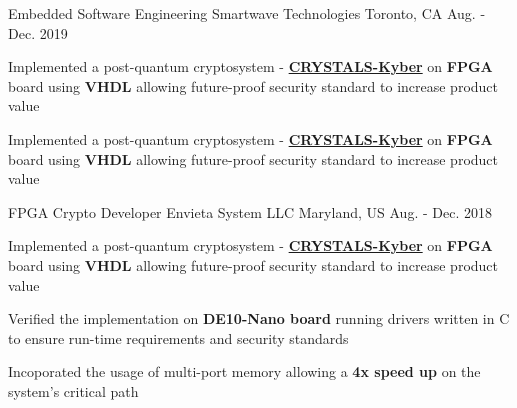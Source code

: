 


\begin{cventries}


\cventry
{Embedded Software Engineering} %
{Smartwave Technologies} %
{Toronto, CA} %
{Aug. - Dec. 2019} %
{ %
\begin{cvitems}
\item {
    Implemented a post-quantum cryptosystem - 
    \textbf{\href{https://pq-crystals.org/}{CRYSTALS-Kyber}} 
    on \textbf{FPGA} board using \textbf{VHDL} allowing
    future-proof security standard to increase product value
}
\item {
    Implemented a post-quantum cryptosystem - 
    \textbf{\href{https://pq-crystals.org/}{CRYSTALS-Kyber}} 
    on \textbf{FPGA} board using \textbf{VHDL} allowing
    future-proof security standard to increase product value
}
\end{cvitems}
}


\cventry
{FPGA Crypto Developer} %
{Envieta System LLC} %
{Maryland, US} %
{Aug. - Dec. 2018} %
{ %
\begin{cvitems}
\item {
    Implemented a post-quantum cryptosystem - 
    \textbf{\href{https://pq-crystals.org/}{CRYSTALS-Kyber}} 
    on \textbf{FPGA} board using \textbf{VHDL} allowing
    future-proof security standard to increase product value
}
\item {
    Verified the implementation on 
    \textbf{DE10-Nano board} running drivers 
    written in C to ensure run-time requirements 
    and security standards
}
\item {
    Incoporated the usage of multi-port memory allowing 
    a \textbf{4x speed up} on the system’s critical path
}
\end{cvitems}
}


\end{cventries}
